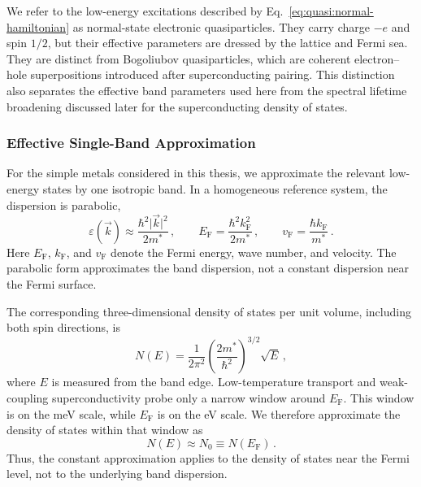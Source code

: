         We refer to the low-energy excitations described by Eq.~\eqref{eq:quasi:normal-hamiltonian} as normal-state electronic quasiparticles. They carry charge $-e$ and spin $1/2$, but their effective parameters are dressed by the lattice and Fermi sea. They are distinct from Bogoliubov quasiparticles, which are coherent electron--hole superpositions introduced after superconducting pairing. This distinction also separates the effective band parameters used here from the spectral lifetime broadening discussed later for the superconducting density of states. \cite{landau_theory_1956,gross_festkorperphysik_2014}

        \subsubsection*{Effective Single-Band Approximation}

            For the simple metals considered in this thesis, we approximate the relevant low-energy states by one isotropic band. In a homogeneous reference system, the dispersion is parabolic,
            \begin{equation}
                \varepsilon(\vec{k})
                \approx \frac{\hbar^2 \lvert\vec{k}\rvert^2}{2m^\ast}\,,
                \qquad
                E_\mathrm{F}
                = \frac{\hbar^2 k_\mathrm{F}^2}{2m^\ast}\,,
                \qquad
                v_\mathrm{F}
                = \frac{\hbar k_\mathrm{F}}{m^\ast}\,.
            \end{equation}
            Here $E_\mathrm{F}$, $k_\mathrm{F}$, and $v_\mathrm{F}$ denote the Fermi energy, wave number, and velocity. The parabolic form approximates the band dispersion, not a constant dispersion near the Fermi surface.

            The corresponding three-dimensional density of states per unit volume, including both spin directions, is
            \begin{equation}
                N(E)
                = \frac{1}{2\pi^2}
                \left(\frac{2m^\ast}{\hbar^2}\right)^{3/2}
                \sqrt{E}\,,
            \end{equation}
            where $E$ is measured from the band edge. Low-temperature transport and weak-coupling superconductivity probe only a narrow window around $E_\mathrm{F}$. This window is on the meV scale, while $E_\mathrm{F}$ is on the eV scale. We therefore approximate the density of states within that window as
            \begin{equation}
                N(E) \approx N_0 \equiv N(E_\mathrm{F})\,.
            \end{equation}
            Thus, the constant approximation applies to the density of states near the Fermi level, not to the underlying band dispersion. \cite{gross_festkorperphysik_2014}


